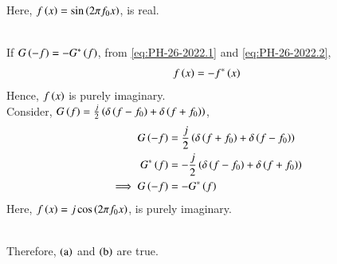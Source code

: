 \documentclass[journal,12pt,twocolumn]{IEEEtran}
\theoremstyle{remark}
\begin{document}
Here, $f\left(x\right) = \sin \left(2 \pi f_0 x\right)$, is real.\\
\begin{figure}[h!]
    \centering
    
    \label{fig:PH-26-2022.1}
\end{figure}\\
If $G\left(-f\right) = - G^*\left(f\right)$, from \eqref{eq:PH-26-2022.1} and \eqref{eq:PH-26-2022.2},
\begin{align}
    f\left(x\right) = -f^*\left(x\right)
\end{align}
Hence, $f\left(x\right)$ is purely imaginary. \\
Consider, $G\left(f\right) = \frac{j}{2} \left( \delta\left( f - f_0 \right) + \delta\left( f + f_0\right) \right) $,
\begin{align}
    G\left(-f\right) &= \frac{j}{2} \left( \delta\left( f + f_0 \right) + \delta\left( f - f_0\right) \right) \\
    G^*\left(f\right) &= -\frac{j}{2} \left( \delta\left( f - f_0 \right) + \delta\left( f + f_0\right) \right) \\
    \implies G\left(-f\right) &= -G^*\left(f\right)
\end{align}
Here, $f\left(x\right) = j \cos\left(2 \pi f_0 x\right)$, is purely imaginary.
\begin{figure}[h!]
    \centering
    
    \label{fig:PH-26-2022.2}
\end{figure}\\
Therefore, $\left(\text{a}\right)$ and $\left(\text{b}\right)$ are true.
\end{document}
